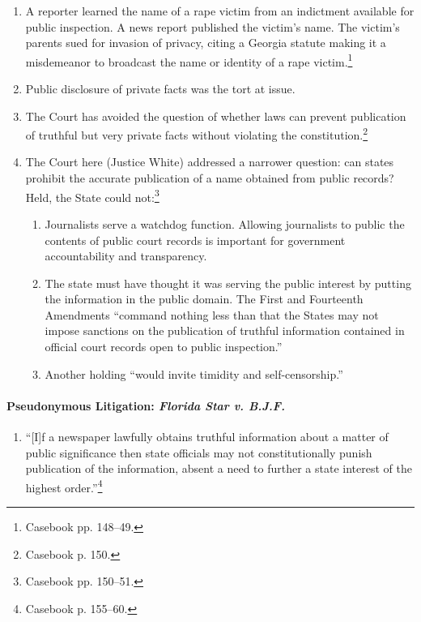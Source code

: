 \begin{enumerate}
    \item A reporter learned the name of a rape victim from an indictment 
    available for public inspection. A news report published the victim's name.  
    The victim's parents sued for invasion of privacy, citing a Georgia statute 
    making it a misdemeanor to broadcast the name or identity of a rape 
    victim.\footnote{Casebook pp.  148--49.}
    \item Public disclosure of private facts was the tort at issue.
    \item The Court has avoided the question of whether laws can prevent 
    publication of truthful but very private facts without violating the 
    constitution.\footnote{Casebook p. 150.}
    \item The Court here (Justice White) addressed a narrower question: can 
    states prohibit the accurate publication of a name obtained from public 
    records? Held, the State could not:\footnote{Casebook pp. 150--51.}
    \begin{enumerate}
        \item Journalists serve a watchdog function. Allowing journalists to 
        public the contents of public court records is important for government 
        accountability and transparency.
        \item The state must have thought it was serving the public interest by 
        putting the information in the public domain. The First and Fourteenth 
        Amendments ``command nothing less than that the States may not impose 
        sanctions on the publication of truthful information contained in 
        official court records open to public inspection.''
        \item Another holding ``would invite timidity and self-censorship.''
    \end{enumerate}
\end{enumerate}

\paragraph{Pseudonymous Litigation: \emph{Florida Star v. B.J.F.}}

\begin{enumerate}
    \item ``[I]f a newspaper lawfully obtains truthful information about a 
    matter of public significance then state officials may not constitutionally 
    punish publication of the information, absent a need to further a state 
    interest of the highest order.''\footnote{Casebook p. 155--60.}
\end{enumerate}

